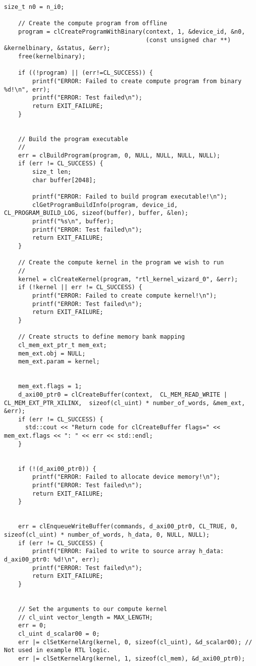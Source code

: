 \begin{lstlisting}[label=code:hostexample3, caption=Содержимое файла host\_example.cpp, breakatwhitespace=false]
    size_t n0 = n_i0;

    // Create the compute program from offline
    program = clCreateProgramWithBinary(context, 1, &device_id, &n0,
                                        (const unsigned char **) &kernelbinary, &status, &err);
    free(kernelbinary);

    if ((!program) || (err!=CL_SUCCESS)) {
        printf("ERROR: Failed to create compute program from binary %d!\n", err);
        printf("ERROR: Test failed\n");
        return EXIT_FAILURE;
    }


    // Build the program executable
    //
    err = clBuildProgram(program, 0, NULL, NULL, NULL, NULL);
    if (err != CL_SUCCESS) {
        size_t len;
        char buffer[2048];

        printf("ERROR: Failed to build program executable!\n");
        clGetProgramBuildInfo(program, device_id, CL_PROGRAM_BUILD_LOG, sizeof(buffer), buffer, &len);
        printf("%s\n", buffer);
        printf("ERROR: Test failed\n");
        return EXIT_FAILURE;
    }

    // Create the compute kernel in the program we wish to run
    //
    kernel = clCreateKernel(program, "rtl_kernel_wizard_0", &err);
    if (!kernel || err != CL_SUCCESS) {
        printf("ERROR: Failed to create compute kernel!\n");
        printf("ERROR: Test failed\n");
        return EXIT_FAILURE;
    }

    // Create structs to define memory bank mapping
    cl_mem_ext_ptr_t mem_ext;
    mem_ext.obj = NULL;
    mem_ext.param = kernel;


    mem_ext.flags = 1;
    d_axi00_ptr0 = clCreateBuffer(context,  CL_MEM_READ_WRITE | CL_MEM_EXT_PTR_XILINX,  sizeof(cl_uint) * number_of_words, &mem_ext, &err);
    if (err != CL_SUCCESS) {
      std::cout << "Return code for clCreateBuffer flags=" << mem_ext.flags << ": " << err << std::endl;
    }


    if (!(d_axi00_ptr0)) {
        printf("ERROR: Failed to allocate device memory!\n");
        printf("ERROR: Test failed\n");
        return EXIT_FAILURE;
    }


    err = clEnqueueWriteBuffer(commands, d_axi00_ptr0, CL_TRUE, 0, sizeof(cl_uint) * number_of_words, h_data, 0, NULL, NULL);
    if (err != CL_SUCCESS) {
        printf("ERROR: Failed to write to source array h_data: d_axi00_ptr0: %d!\n", err);
        printf("ERROR: Test failed\n");
        return EXIT_FAILURE;
    }


    // Set the arguments to our compute kernel
    // cl_uint vector_length = MAX_LENGTH;
    err = 0;
    cl_uint d_scalar00 = 0;
    err |= clSetKernelArg(kernel, 0, sizeof(cl_uint), &d_scalar00); // Not used in example RTL logic.
    err |= clSetKernelArg(kernel, 1, sizeof(cl_mem), &d_axi00_ptr0); 


\end{lstlisting}
